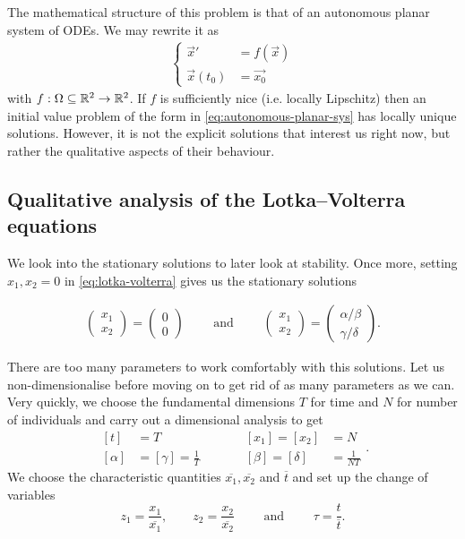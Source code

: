 The mathematical structure of this problem is that of an autonomous planar
system of ODEs. We may rewrite it as
\begin{align}
  \label{eq:autonomous-planar-sys}
  \begin{cases}
    \vec{x}'     &= f(\vec{x}) \\
    \vec{x}(t_0) &= \vec{x_0}
  \end{cases}
\end{align}
with $f : \Omega \subseteq \mathbb{R}^2 \to \mathbb{R}^2$. If $f$ is sufficiently nice (i.e.
locally Lipschitz) then an initial value problem of the form in
\ref{eq:autonomous-planar-sys} has locally unique solutions. However, it is not
the explicit solutions that interest us right now, but rather the qualitative
aspects of their behaviour.

\subsection{Qualitative analysis of the Lotka--Volterra equations}

We look into the stationary solutions to later look at stability. Once more,
setting $x_1, x_2 = 0$ in \ref{eq:lotka-volterra} gives us the stationary
solutions

\begin{align*}
  \left(
    \begin{array}
      {c}
      x_1 \\ x_2
    \end{array}
  \right) = \left(
    \begin{array}
      {c}
      0 \\ 0
    \end{array}
  \right) \qquad \text{ and } \qquad \left(
    \begin{array}
      {c}
      x_1 \\ x_2
    \end{array}
  \right) = \left(
    \begin{array}
      {c}
      \alpha / \beta \\ \gamma / \delta
    \end{array}
  \right).
\end{align*}

There are too many parameters to work comfortably with this solutions. Let us
non-dimensionalise before moving on to get rid of as many parameters as we can.
Very quickly, we choose the fundamental dimensions $T$ for time and $N$ for
number of individuals and carry out a dimensional analysis to get
\[
\begin{array}{rlcrl}
  [t]                   & = T                                   & \qquad & [x_1] = [x_2]                                & = N \\
  \left[ \alpha \right] & = \left[ \gamma \right] = \frac{1}{T} &        & \left[ \beta \right] = \left[ \delta \right] & = \frac{1}{NT}
\end{array}
.
\]
We choose the characteristic quantities $\overline{x_1}, \overline{x_2}$ and
$\overline{t}$ and set up the change of variables
\[
  z_1 = \frac{x_1}{\overline{x_1}},\qquad
  z_2 = \frac{x_2}{\overline{x_2}} \qquad \text{ and } \qquad
  \tau = \frac{t}{\overline{t}}.
\]


